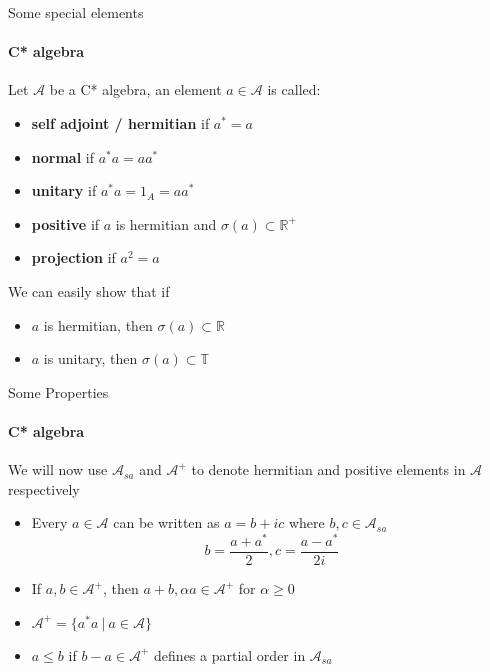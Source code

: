 \documentclass[handout, dvipsnames]{beamer}
\newcommand{\1}{\mathds{1}}	%
\begin{document}
\begin{frame}{Some special elements}
\framesubtitle{C* algebra}
\begin{definition}
  Let $\mathcal{A}$ be a C* algebra, an element $a \in \mathcal{A}$ is called:
  \begin{itemize}
    \item \textbf{self adjoint / hermitian} if $a^* = a$ \pause
    \item {\bf normal} if $a^*a = aa^*$ \pause
    \item {\bf unitary} if $a^*a = 1_A = aa^*$ \pause
    \item {\bf positive} if $a$ is hermitian and $\sigma(a) \subset \mathbb{R}^+$ \pause
    \item {\bf projection} if $a^2 = a$
  \end{itemize}
\end{definition}

\pause
We can easily show that if
\begin{itemize}
  \item $a$ is hermitian, then $\sigma(a) \subset \mathbb{R}$ \pause
  \item $a$ is unitary, then $\sigma(a) \subset \mathbb{T}$ 
\end{itemize}
\end{frame}

\begin{frame}{Some Properties}
\framesubtitle{C* algebra}
  We will now use $\mathcal{A}_{sa}$ and $\mathcal{A}^+$ to denote hermitian and positive elements in $\mathcal{A}$ respectively \pause 
  \begin{itemize}
    \item Every $a \in \mathcal{A}$ can be written as $a = b + ic$ where $b, c \in \mathcal{A}_{sa}$ \pause $$b = \frac{a + a^*}{2}, c = \frac{a - a^*}{2i}$$ \pause
    \item If $a, b \in \mathcal{A}^+$, then $a+b, \alpha a \in \mathcal{A}^+$ for $\alpha \ge 0$ \pause
    \item $\mathcal{A}^+ = \{a^*a \ | \ a \in \mathcal{A}\}$ \pause
    \item $a \le b$ if $b - a \in \mathcal{A}^+$ defines a partial order in $\mathcal{A}_{sa}$
  \end{itemize}
\end{frame}
\end{document}
